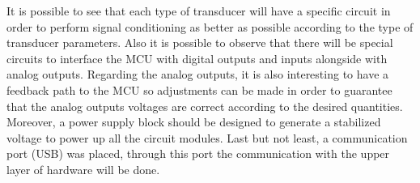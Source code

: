 		It is possible to see that each type of transducer will have a specific circuit in order to perform signal conditioning as better as possible according to the type of transducer parameters. Also it is possible to observe that there will be special circuits to interface the MCU with digital outputs and inputs alongside with analog outputs. Regarding the analog outputs, it is also interesting to have a feedback path to the MCU so adjustments can be made in order to guarantee that the analog outputs voltages are correct according to the desired quantities. Moreover, a power supply block should be designed to generate a stabilized voltage to power up all the circuit modules. Last but not least, a communication port (USB) was placed, through this port the communication with the upper layer of hardware will be done.